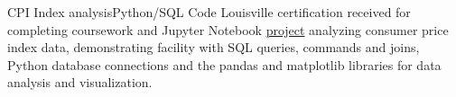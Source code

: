 \datedsubsection{}
{CPI Index analysis}{Python/SQL}
{Code Louisville certification received for completing coursework and Jupyter Notebook \href{https://github.com/jacobarchambault/cpi-python}{project} analyzing consumer price index data, demonstrating facility with SQL queries, commands and joins, 
	Python database connections and the pandas and matplotlib libraries for data analysis and visualization.}
